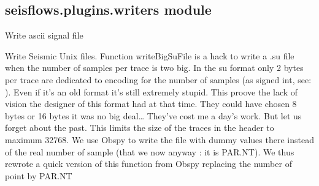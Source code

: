 \documentclass[letterpaper,10pt,english]{sphinxmanual}
\begin{document}
\begin{fulllineitems}
\label{\detokenize{ref/seisflows.plugins:seisflows.plugins.wavelets.ricker}}
\end{fulllineitems}



\subsection{seisflows.plugins.writers module}
\label{\detokenize{ref/seisflows.plugins:module-seisflows.plugins.writers}}\label{\detokenize{ref/seisflows.plugins:seisflows-plugins-writers-module}}

\begin{fulllineitems}
\label{\detokenize{ref/seisflows.plugins:seisflows.plugins.writers.ascii}}
Write ascii signal file

\end{fulllineitems}


\begin{fulllineitems}
\label{\detokenize{ref/seisflows.plugins:seisflows.plugins.writers.su}}
Write Seismic Unix files.
Function writeBigSuFile is a hack to write a .su file when the number
of samples per trace is two big.
In the su format only 2 bytes per trace are dedicated to encoding for
the number of samples (as signed int, see:
).
Even if it’s an old format it’s still extremely stupid.
This proove the lack of vision the designer of this format had at that
time. They could have chosen 8 bytes or 16 bytes it was no big deal…
They’ve cost me a day’s work.
But let us forget about the past. This limits the size of the
traces in the header to maximum 32768.
We use Obspy to write the file with dummy values there instead of the
real number of sample (that we now anyway : it is PAR.NT).
We thus rewrote a quick version of this function from Obspy replacing
the number of point by PAR.NT

\end{fulllineitems}
\end{document}
